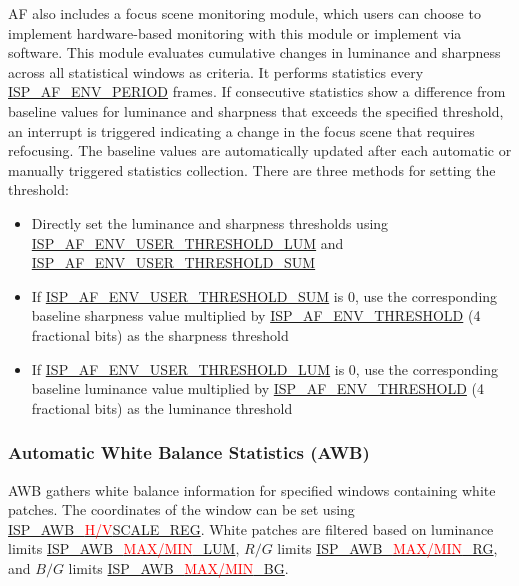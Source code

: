 \documentclass[main\_\_EN.tex]{subfiles}
\begin{document}
AF also includes a focus scene monitoring module, which users can choose to implement hardware-based monitoring with this module or implement via software. This module evaluates cumulative changes in luminance and sharpness across all statistical windows as criteria. It performs statistics every \hyperref[fielddesc:ISPAFENVPERIOD]{ISP\_AF\_ENV\_PERIOD} frames. If consecutive statistics show a difference from baseline values for luminance and sharpness that exceeds the specified threshold, an interrupt is triggered indicating a change in the focus scene that requires refocusing. The baseline values are automatically updated after each automatic or manually triggered statistics collection. There are three methods for setting the threshold:
\begin{itemize}
    \item Directly set the luminance and sharpness thresholds using \hyperref[fielddesc:ISPAFENVUSERTHRESHOLDLUM]{ISP\_AF\_ENV\_USER\_THRESHOLD\_LUM} and \hyperref[fielddesc:ISPAFENVUSERTHRESHOLDSUM]{ISP\_AF\_ENV\_USER\_THRESHOLD\_SUM}
    \item If \hyperref[fielddesc:ISPAFENVUSERTHRESHOLDSUM]{ISP\_AF\_ENV\_USER\_THRESHOLD\_SUM} is 0, use the corresponding baseline sharpness value multiplied by \hyperref[fielddesc:ISPAFENVTHRESHOLD]{ISP\_AF\_ENV\_THRESHOLD} (4 fractional bits) as the sharpness threshold
    \item If \hyperref[fielddesc:ISPAFENVUSERTHRESHOLDLUM]{ISP\_AF\_ENV\_USER\_THRESHOLD\_LUM} is 0, use the corresponding baseline luminance value multiplied by \hyperref[fielddesc:ISPAFENVTHRESHOLD]{ISP\_AF\_ENV\_THRESHOLD} (4 fractional bits) as the luminance threshold
\end{itemize}


\subsubsection{Automatic White Balance Statistics (AWB)}

AWB gathers white balance information for specified windows containing white patches. The coordinates of the window can be set using \hyperref[regdesc:ISPAWBHSCALEREG]{ISP\_AWB\_\textcolor{red}{H/V}SCALE\_REG}. White patches are filtered based on luminance limits \hyperref[fielddesc:ISPAWBMAXLUM]{ISP\_AWB\_\textcolor{red}{MAX/MIN}\_LUM}, $R/G$ limits \hyperref[fielddesc:ISPAWBMAXRG]{ISP\_AWB\_\textcolor{red}{MAX/MIN}\_RG}, and $B/G$ limits \hyperref[fielddesc:ISPAWBMAXBG]{ISP\_AWB\_\textcolor{red}{MAX/MIN}\_BG}.
\end{document}
